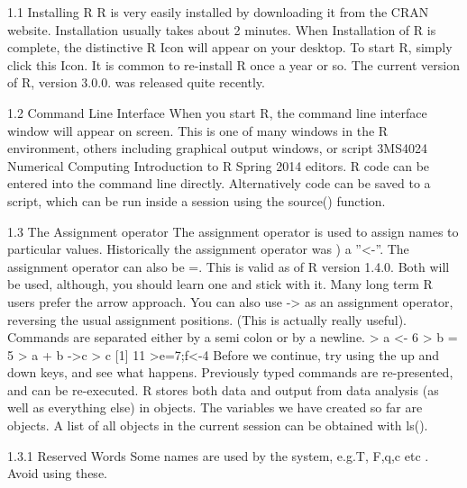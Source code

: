 \documentclass{beamer}
\begin{document}
\begin{frame}

1.1 Installing R
R is very easily installed by downloading it from the CRAN website. Installation usually takes
about 2 minutes. When Installation of R is complete, the distinctive R Icon will appear on your
desktop. To start R, simply click this Icon. It is common to re-install R once a year or so. The
current version of R, version 3.0.0. was released quite recently.
\end{frame}
\begin{frame}

1.2 Command Line Interface
When you start R, the command line interface window will appear on screen. This is one
of many windows in the R environment, others including graphical output windows, or script
3MS4024 Numerical Computing Introduction to R Spring 2014
editors. R code can be entered into the command line directly. Alternatively code can be saved
to a script, which can be run inside a session using the source() function.
\end{frame}
\begin{frame}

1.3 The Assignment operator
The assignment operator is used to assign names to particular values. Historically the assignment
operator was ) a ”<-”. The assignment operator can also be =. This is valid as of R
version 1.4.0.
Both will be used, although, you should learn one and stick with it. Many long term R
users prefer the arrow approach. You can also use -> as an assignment operator, reversing the
usual assignment positions. (This is actually really useful). Commands are separated either by
a semi colon or by a newline.
> a <- 6
> b = 5
> a + b ->c
> c
[1] 11
>e=7;f<-4
Before we continue, try using the up and down keys, and see what happens. Previously
typed commands are re-presented, and can be re-executed.
R stores both data and output from data analysis (as well as everything else) in objects.
The variables we have created so far are objects. A list of all objects in the current session can
be obtained with ls().
\end{frame}
\begin{frame}

1.3.1 Reserved Words
Some names are used by the system, e.g.T, F,q,c etc . Avoid using these.
\end{frame}
\end{document}
